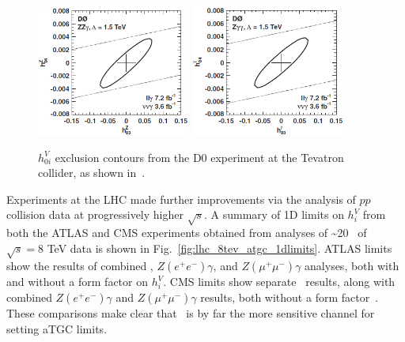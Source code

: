\documentclass[oneside, letterpaper, 12pt, oldfontcommands]{memoir}
\begin{document}
\begin{figure}[hbtp]
  \begin{center}
    \includegraphics[width=0.45\textwidth]{Figures/d0_ZZg.png}
    \includegraphics[width=0.45\textwidth]{Figures/d0_Zgg.png}
    \caption{
      $h_{0i}^{V}$ exclusion contours from the D0 experiment at the Tevatron collider, as shown in~\cite{ref:PhysRevD.85.052001}.
    }
    \label{fig:d0_aTGC}
  \end{center}
\end{figure}

Experiments at the LHC made further improvements via the analysis of $pp$ collision data at progressively higher $\sqrt{s}$.
A summary of 1D limits on $h_{i}^{V}$ from both the ATLAS and CMS experiments obtained from analyses of \textasciitilde20 \fbinv\ of $\sqrt{s} = 8$ TeV data
is shown in Fig.~\ref{fig:lhc_8tev_atgc_1dlimits}. ATLAS limits show the results
of combined \zinvg, $Z(e^\mathrm{+}e^\mathrm{-})\gamma$, and $Z(\mu^\mathrm{+}\mu^\mathrm{-})\gamma$
analyses, both with and without a form factor on $h_{i}^{V}$. CMS limits show separate \zinvg\ results,
along with combined $Z(e^\mathrm{+}e^\mathrm{-})\gamma$ and $Z(\mu^\mathrm{+}\mu^\mathrm{-})\gamma$
results, both without a form factor~\cite{ref:RevModPhys.89.035008}. These comparisons make clear that \zinvg\ is by far
the more sensitive channel for setting aTGC limits.
\end{document}
